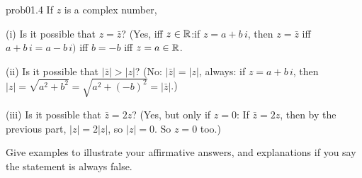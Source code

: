 \begin{sol}{prob01.4}   If $z$ is a complex number,

(i)  Is it possible that $z={\bar z}$? \soln (Yes, iff $z\in \mathbb{R}$:if $z=a + b\, i$, then $z={\bar z}$ iff $a + b\, i = a - b\, i )$ iff $b=-b$ iff $z=a \in \mathbb{R}$.

(ii)  Is it possible that $|{\bar z}|>|z|$? \soln (No: $|{\bar z}|=|z|$, always: if $z=a + b\, i$, then $|z|=\sqrt{a^2+b^2}=\sqrt{a^2+(-b)^2} =|{\bar z}|$.)

(iii)  Is it possible that ${\bar z}=2z$? \soln(Yes, but only if $z=0$: If ${\bar z}=2z$, then by the previous part, $|z|=2 |z|$, so $|z|=0$. So $z=0$ too.)

\medskip Give  examples to illustrate your affirmative answers, and explanations if you say the statement is always false.
\end{sol}